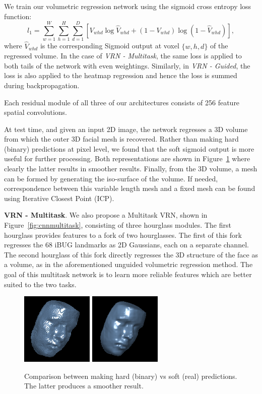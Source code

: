 We train our volumetric regression network using the sigmoid cross
entropy loss function:
\begin{equation} l_{1} = \sum\limits_{w=1}^{W}
  \sum\limits_{h=1}^{H}\sum\limits_{d=1}^{D}[V_{whd}\log
  \widehat{V}_{whd}+(1-V_{whd})\log(1-\widehat{V}_{whd})],
\end{equation} where $\widehat{V}_{whd}$ is the corresponding Sigmoid
output at voxel $\{w,h,d\}$ of the regressed volume. In the case of
\textit{VRN - Multitask}, the same loss is applied to both tails of
the network with even weightings. Similarly, in \textit{VRN - Guided},
the loss is also applied to the heatmap regression and hence the loss
is summed during backpropagation.

Each residual module of all three of our architectures consists of 256
feature spatial convolutions.

At test time, and given an input 2D image, the network regresses a 3D
volume from which the outer 3D facial mesh is recovered. Rather than
making hard (binary) predictions at pixel level, we found that the
soft sigmoid output is more useful for further processing. Both
representations are shown in Figure~\ref{fig:roughvssmooth} where
clearly the latter results in smoother results. Finally, from the 3D
volume, a mesh can be formed by generating the iso-surface of the
volume. If needed, correspondence between this variable length mesh
and a fixed mesh can be found using Iterative Closest Point (ICP).

\textbf{VRN - Multitask}. We also propose a Multitask VRN, shown in
Figure~\ref{fig:cnnmultitask}, consisting of three hourglass
modules. The first hourglass provides features to a fork of two
hourglasses. The first of this fork regresses the 68 iBUG landmarks
\cite{sagonas2013semi} as 2D Gaussians, each on a separate
channel. The second hourglass of this fork directly regresses the 3D
structure of the face as a volume, as in the aforementioned unguided
volumetric regression method. The goal of this multitask network is to
learn more reliable features which are better suited to the two tasks.


\begin{figure}
  \centering
  \includegraphics[width=0.2\linewidth]{img/example_rough.png}
  \includegraphics[width=0.2\linewidth]{img/example_smooth.png}
  \caption[Binary vs Real volumes]{Comparison between making hard
    (binary) vs soft (real) predictions. The latter produces a
    smoother result.}
  \label{fig:roughvssmooth}
  \vspace{-4mm}
\end{figure}


